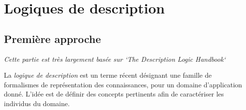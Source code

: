 
\section{Logiques de description}
\label{sec:logiq-de-descr}

\subsection{Première approche}
\label{sec:premiere-approche}

\emph{Cette partie est très largement basée sur `The Description Logic Handbook`}
\par La \emph{logique de description} est un terme récent désignant une famille de formalismes de représentation des connaissances, pour un domaine d'application donné. L'idée est de définir des concepts pertinents afin de caractériser les individus du domaine.

